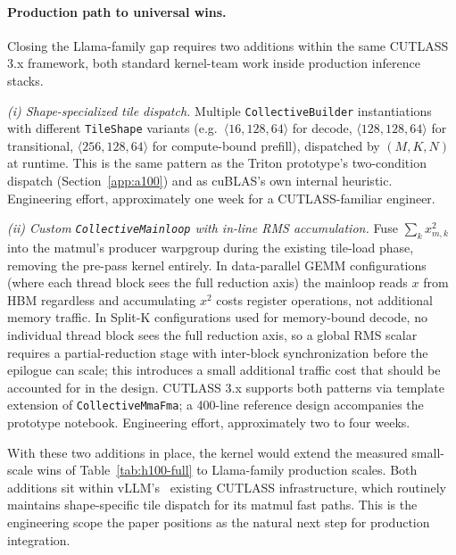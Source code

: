 \documentclass{article}
\begin{document}
\paragraph{Production path to universal wins.} Closing the Llama-family gap requires two additions within the same CUTLASS 3.x framework, both standard kernel-team work inside production inference stacks.

\textit{(i) Shape-specialized tile dispatch.} Multiple \texttt{CollectiveBuilder} instantiations with different \texttt{TileShape} variants (e.g.\ $\langle 16, 128, 64 \rangle$ for decode, $\langle 128, 128, 64 \rangle$ for transitional, $\langle 256, 128, 64 \rangle$ for compute-bound prefill), dispatched by $(M, K, N)$ at runtime. This is the same pattern as the Triton prototype's two-condition dispatch (Section~\ref{app:a100}) and as cuBLAS's own internal heuristic. Engineering effort, approximately one week for a CUTLASS-familiar engineer.

\textit{(ii) Custom \texttt{CollectiveMainloop} with in-line RMS accumulation.} Fuse $\sum_k x^2_{m,k}$ into the matmul's producer warpgroup during the existing tile-load phase, removing the pre-pass kernel entirely. In data-parallel GEMM configurations (where each thread block sees the full reduction axis) the mainloop reads $x$ from HBM regardless and accumulating $x^2$ costs register operations, not additional memory traffic. In Split-K configurations used for memory-bound decode, no individual thread block sees the full reduction axis, so a global RMS scalar requires a partial-reduction stage with inter-block synchronization before the epilogue can scale; this introduces a small additional traffic cost that should be accounted for in the design. CUTLASS 3.x supports both patterns via template extension of \texttt{CollectiveMmaFma}; a 400-line reference design accompanies the prototype notebook. Engineering effort, approximately two to four weeks.

With these two additions in place, the kernel would extend the measured small-scale wins of Table~\ref{tab:h100-full} to Llama-family production scales. Both additions sit within vLLM's~\citep{vLLM} existing CUTLASS infrastructure, which routinely maintains shape-specific tile dispatch for its matmul fast paths. This is the engineering scope the paper positions as the natural next step for production integration.
\end{document}
